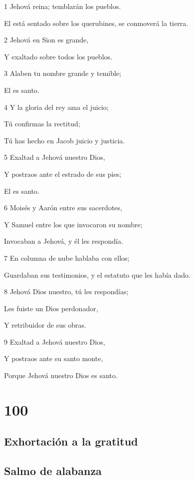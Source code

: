 \par 1 Jehová reina; temblarán los pueblos.
\par El está sentado sobre los querubines, se conmoverá la tierra.
\par 2 Jehová en Sion es grande,
\par Y exaltado sobre todos los pueblos.
\par 3 Alaben tu nombre grande y temible;
\par El es santo.
\par 4 Y la gloria del rey ama el juicio;
\par Tú confirmas la rectitud;
\par Tú has hecho en Jacob juicio y justicia.
\par 5 Exaltad a Jehová nuestro Dios,
\par Y postraos ante el estrado de sus pies;
\par El es santo.
\par 6 Moisés y Aarón entre sus sacerdotes,
\par Y Samuel entre los que invocaron su nombre;
\par Invocaban a Jehová, y él les respondía.
\par 7 En columna de nube hablaba con ellos;
\par Guardaban sus testimonios, y el estatuto que les había dado.
\par 8 Jehová Dios nuestro, tú les respondías;
\par Les fuiste un Dios perdonador,
\par Y retribuidor de sus obras.
\par 9 Exaltad a Jehová nuestro Dios,
\par Y postraos ante su santo monte,
\par Porque Jehová nuestro Dios es santo.

\chapter{100}

\section*{Exhortación a la gratitud}

\section*{Salmo de alabanza}

